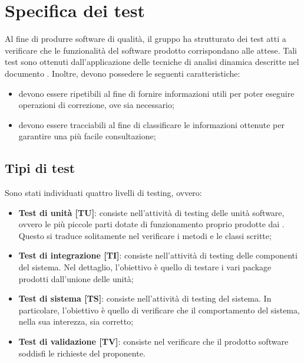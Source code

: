 \documentclass[PianoDiQualifica.tex]{subfiles}
\begin{document}
\section{Specifica dei test}
Al fine di produrre software di qualità, il gruppo ha strutturato dei test atti a verificare che le funzionalità del software prodotto corrispondano alle attese.
Tali test sono ottenuti dall'applicazione delle tecniche di analisi dinamica descritte nel documento \NPdocRP{}. Inoltre, devono possedere le seguenti caratteristiche:
\begin{itemize}
	\item devono essere ripetibili al fine di fornire informazioni utili per poter eseguire operazioni di correzione, ove sia necessario;
	\item devono essere tracciabili al fine di classificare le informazioni ottenute per garantire una più facile consultazione;
\end{itemize}

	\subsection{Tipi di test}
		Sono stati individuati quattro livelli di testing, ovvero:
		\begin{itemize}
			\item \textbf{Test di unità [TU]}: consiste nell'attività di testing delle unità software, ovvero le più piccole parti dotate di funzionamento proprio prodotte dai \PRP{}.
			Questo si traduce solitamente nel verificare i metodi e le classi scritte;
			\item \textbf{Test di integrazione [TI]}: consiste nell'attività di testing delle componenti del sistema. Nel dettaglio, l'obiettivo è quello di testare i vari package
			prodotti dall'unione delle unità;
			\item \textbf{Test di sistema [TS]}: consiste nell'attività di testing del sistema. In particolare, l'obiettivo è quello di verificare che il comportamento del sistema,
			nella sua interezza, sia corretto;
			\item \textbf{Test di validazione [TV]}: consiste nel verificare che il prodotto software soddisfi le richieste del proponente.
		\end{itemize}
	
\end{document}
